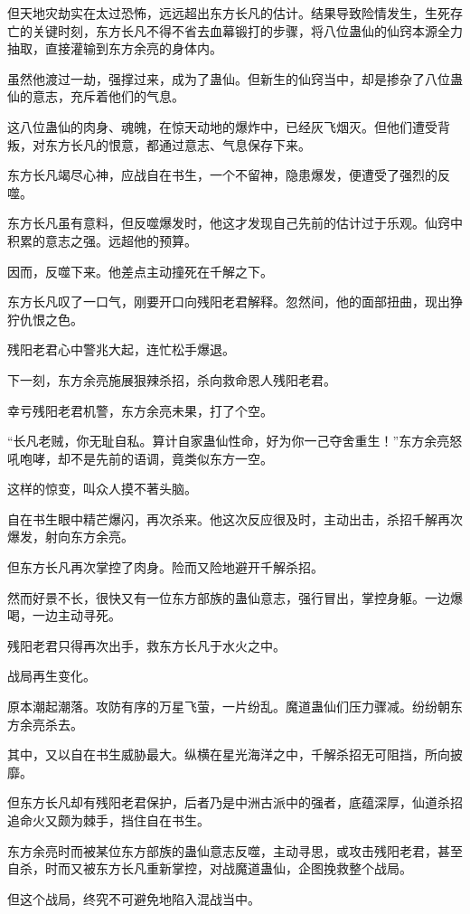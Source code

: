\begin{this_body}
但天地灾劫实在太过恐怖，远远超出东方长凡的估计。结果导致险情发生，生死存亡的关键时刻，东方长凡不得不省去血幕锻打的步骤，将八位蛊仙的仙窍本源全力抽取，直接灌输到东方余亮的身体内。

虽然他渡过一劫，强撑过来，成为了蛊仙。但新生的仙窍当中，却是掺杂了八位蛊仙的意志，充斥着他们的气息。

这八位蛊仙的肉身、魂魄，在惊天动地的爆炸中，已经灰飞烟灭。但他们遭受背叛，对东方长凡的恨意，都通过意志、气息保存下来。

东方长凡竭尽心神，应战自在书生，一个不留神，隐患爆发，便遭受了强烈的反噬。

东方长凡虽有意料，但反噬爆发时，他这才发现自己先前的估计过于乐观。仙窍中积累的意志之强。远超他的预算。

因而，反噬下来。他差点主动撞死在千解之下。

东方长凡叹了一口气，刚要开口向残阳老君解释。忽然间，他的面部扭曲，现出狰狞仇恨之色。

残阳老君心中警兆大起，连忙松手爆退。

下一刻，东方余亮施展狠辣杀招，杀向救命恩人残阳老君。

幸亏残阳老君机警，东方余亮未果，打了个空。

“长凡老贼，你无耻自私。算计自家蛊仙性命，好为你一己夺舍重生！”东方余亮怒吼咆哮，却不是先前的语调，竟类似东方一空。

这样的惊变，叫众人摸不著头脑。

自在书生眼中精芒爆闪，再次杀来。他这次反应很及时，主动出击，杀招千解再次爆发，射向东方余亮。

但东方长凡再次掌控了肉身。险而又险地避开千解杀招。

然而好景不长，很快又有一位东方部族的蛊仙意志，强行冒出，掌控身躯。一边爆喝，一边主动寻死。

残阳老君只得再次出手，救东方长凡于水火之中。

战局再生变化。

原本潮起潮落。攻防有序的万星飞萤，一片纷乱。魔道蛊仙们压力骤减。纷纷朝东方余亮杀去。

其中，又以自在书生威胁最大。纵横在星光海洋之中，千解杀招无可阻挡，所向披靡。

但东方长凡却有残阳老君保护，后者乃是中洲古派中的强者，底蕴深厚，仙道杀招追命火又颇为棘手，挡住自在书生。

东方余亮时而被某位东方部族的蛊仙意志反噬，主动寻思，或攻击残阳老君，甚至自杀，时而又被东方长凡重新掌控，对战魔道蛊仙，企图挽救整个战局。

但这个战局，终究不可避免地陷入混战当中。


\end{this_body}
